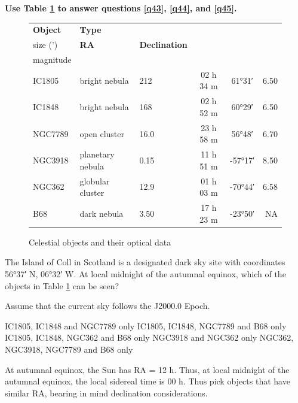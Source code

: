 \documentclass[a4paper,11pt]{exam}
\begin{document}
\begin{questions}
\filbreak
\begin{EnvUplevel}
	\vspace{20pt}
	\textbf{Use	Table \ref{q43.1} to answer questions \ref{q43}, \ref{q44}, and \ref{q45}.}
	\begin{figure}[H]
		\centering
		\begin{tabularx}{0.8\textwidth}{@{}lXlccr@{}}
			\toprule
			\textbf{Object} & \textbf{Type}    & \textbf{\textbf{\begin{tabular}[c]{@{}l@{}}Angular \\[-6pt] size (')\end{tabular}}} & \textbf{RA} & \textbf{Declination} & \textbf{\begin{tabular}[c]{@{}r@{}}Apparent \\[-6pt] magnitude\end{tabular}} \\ \midrule
			IC1805  & bright nebula    & 212  & 02 h 34 m & \ang{+61;31;} & 6.50         \\
			IC1848  & bright nebula    & 168  & 02 h 52 m & \ang{+60;29;} & 6.50         \\
			NGC7789 & open cluster     & 16.0 & 23 h 58 m & \ang{+56;48;} & 6.70         \\
			NGC3918 & planetary nebula & 0.15 & 11 h 51 m & \ang{-57;17;} & 8.50         \\
			NGC362  & globular cluster & 12.9 & 01 h 03 m & \ang{-70;44;} & 6.58         \\
			B68     & dark nebula      & 3.50 & 17 h 23 m & \ang{-23;50;} & NA           \\ \bottomrule
		\end{tabularx}
		\renewcommand{\figurename}{Table}
		\caption{Celestial objects and their optical data}
		\label{q43.1}
	\end{figure}
	\vspace{-32pt}
\end{EnvUplevel}
\filbreak
\question\label{q43}
	The Island of Coll in Scotland is a designated dark sky site with coordinates \ang{56;37;} N, \ang{06;32;} W. At local midnight of the autumnal equinox, which of the objects in Table \ref{q43.1} can be seen?

	Assume that the current sky follows the J2000.0 Epoch.
	\begin{choices}
		\correctchoice	IC1805, IC1848 and NGC7789 only
		\choice	IC1805, IC1848, NGC7789 and B68 only
		\choice	IC1805, IC1848, NGC362 and B68 only
		\choice	NGC3918 and NGC362 only
		\choice	NGC362, NGC3918, NGC7789 and B68 only
	\end{choices}
	\begin{solution}
		At autumnal equinox, the Sun has RA = 12 h. Thus, at local midnight of the autumnal equinox, the local sidereal time is 00 h.  Thus pick objects that have similar RA, bearing in mind declination considerations.
	\end{solution}


\end{questions}
\end{document}
